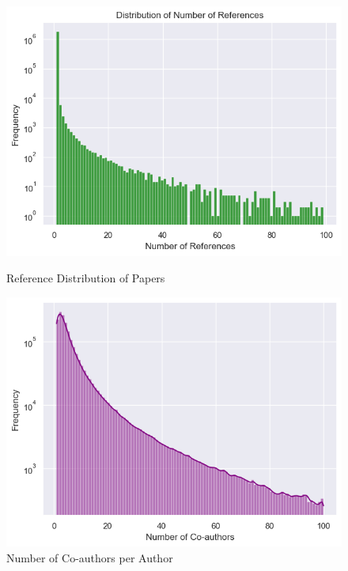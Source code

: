 \documentclass[11pt]{article}
\begin{document}
\begin{figure}[h!]
\begin{minipage}{0.24\textwidth}
		\includegraphics[width=\textwidth]{img/preprocess/num_references.png}
		\caption{Reference Distribution of Papers}
		\label{fig:reference_distribution}
	\end{minipage} \hfill
	\begin{minipage}{0.24\textwidth}
		\centering
		\includegraphics[width=\textwidth]{img/preprocess/num_coauthors.png}
		\caption{Number of Co-authors per Author}
		\label{fig:num_coauthors_per_author}
	\end{minipage} 
\end{figure}
\end{document}
